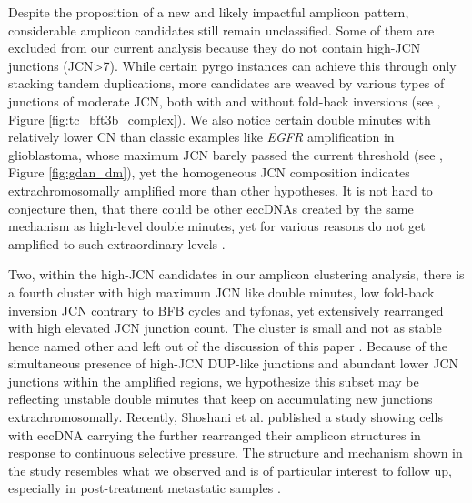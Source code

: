 \documentclass[phd,tocprelim]{cornell}
\begin{document}
Despite the proposition of a new and likely impactful amplicon pattern, considerable amplicon candidates still remain unclassified. Some of them are excluded from our current analysis because they do not contain high-JCN junctions (JCN>7). While certain pyrgo instances can achieve this through only stacking tandem duplications, more candidates are weaved by various types of junctions of moderate JCN, both with and without fold-back inversions (see , Figure \ref{fig:tc_bft3b_complex}). We also notice certain double minutes with relatively lower CN than classic examples like \textit{EGFR} amplification in glioblastoma, whose maximum JCN barely passed the current threshold (see , Figure \ref{fig:gdan_dm}), yet the homogeneous JCN composition indicates extrachromosomally amplified more than other hypotheses. It is not hard to conjecture then, that there could be other eccDNAs created by the same mechanism as high-level double minutes, yet for various reasons do not get amplified to such extraordinary levels \cite{Lange2021-if}.

Two, within the high-JCN candidates in our amplicon clustering analysis, there is a fourth cluster with high maximum JCN like double minutes, low fold-back inversion JCN contrary to BFB cycles and tyfonas, yet extensively rearranged with high elevated JCN junction count. The cluster is small and not as stable hence named other and left out of the discussion of this paper \cite{Hadi2020-um}. Because of the simultaneous presence of high-JCN DUP-like junctions and abundant lower JCN junctions within the amplified regions, we hypothesize this subset may be reflecting unstable double minutes that keep on accumulating new junctions extrachromosomally. Recently, Shoshani et al. published a study showing cells with eccDNA carrying the  further rearranged their amplicon structures in response to continuous selective pressure. The structure and mechanism shown in the study resembles what we observed and is of particular interest to follow up, especially in post-treatment metastatic samples \cite{Priestley:20196a6}.



\end{document}
